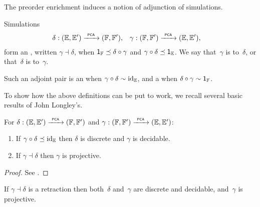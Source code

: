 The preorder enrichment induces a notion of adjunction of simulations.

\begin{definition}
  Simulations
  \begin{align*}
    \delta &: (\EE, \subEE) \pcato (\FF, \subFF),
    &
    \gamma &: (\FF, \subFF) \pcato (\EE, \subEE),
  \end{align*}
  form an , written $\gamma \dashv \delta$, when
  $\one_{\FF} \preceq \delta \circ \gamma$ and $\gamma \circ
  \delta \preceq \one_{\EE}$. We say that~$\gamma$ is  to~$\delta$, or that~$\delta$ is 
  to~$\gamma$.

  Such an adjoint pair is an  when $\gamma \circ \delta \sim \id[\EE]$, and a
   when $\delta \circ \gamma \sim \one_\FF$.
\end{definition}

To show how the above definitions can be put to work, we recall several basic results of John Longley's.

\begin{theorem}
  \label{th:simulation-properties2}%
  For $\delta: (\EE, \subEE) \pcato (\FF, \subFF)$ and
  $\gamma: (\FF, \subFF) \pcato (\EE, \subEE)$:
  \begin{enumerate}
  \item
    If $\gamma \circ \delta \preceq \id[\EE]$ then $\delta$ is discrete 
    and $\gamma$ is decidable.
  \item
    If $\gamma \dashv \delta$ then $\gamma$ is projective.
  \end{enumerate}
\end{theorem}

\begin{proof}
  See \cite[Theorem 2.5.3]{Longley:94}.
\end{proof}

\begin{corollary}
  \label{th:simulation-properties}%
  If $\gamma \dashv \delta$ is a retraction then both~$\delta$
  and~$\gamma$ are discrete and decidable, and~$\gamma$ is projective.
\end{corollary}

